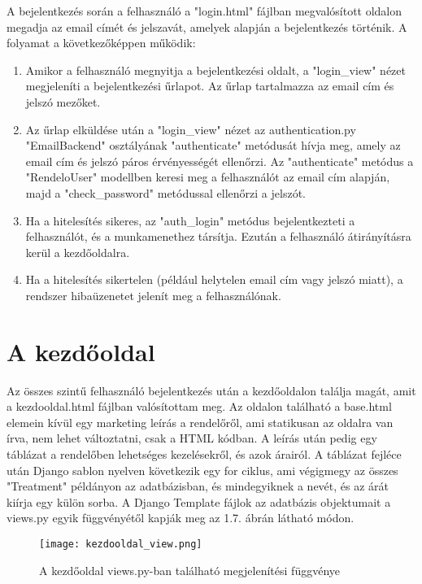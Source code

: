 A bejelentkezés során a felhasználó a "login.html" fájlban megvalósított oldalon megadja az email címét és jelszavát, amelyek alapján a bejelentkezés történik. A folyamat a következőképpen működik:

\begin{enumerate}
	\item Amikor a felhasználó megnyitja a bejelentkezési oldalt, a "login\_view" nézet megjeleníti a bejelentkezési űrlapot. Az űrlap tartalmazza az email cím és jelszó mezőket.
	\item Az űrlap elküldése után a "login\_view" nézet az authentication.py "EmailBackend" osztályának "authenticate" metódusát hívja meg, amely az email cím és jelszó páros érvényességét ellenőrzi. Az "authenticate" metódus a "RendeloUser" modellben keresi meg a felhasználót az email cím alapján, majd a "check\_password" metódussal ellenőrzi a jelszót.
	\item Ha a hitelesítés sikeres, az "auth\_login" metódus bejelentkezteti a felhasználót, és a munkamenethez társítja. Ezután a felhasználó átirányításra kerül a kezdőoldalra.
	\item Ha a hitelesítés sikertelen (például helytelen email cím vagy jelszó miatt), a rendszer hibaüzenetet jelenít meg a felhasználónak.
\end{enumerate}

\section{A kezdőoldal}

Az összes szintű felhasználó bejelentkezés után a kezdőoldalon találja magát, amit a kezdooldal.html fájlban valósítottam meg. Az oldalon található a base.html elemein kívül egy marketing leírás a rendelőről, ami statikusan az oldalra van írva, nem lehet változtatni, csak a HTML kódban.
A leírás után pedig egy táblázat a rendelőben lehetséges kezelésekről, és azok árairól. A táblázat fejléce után Django sablon nyelven következik egy for ciklus, ami végigmegy az összes "Treatment" példányon az adatbázisban, és mindegyiknek a nevét, és az árát kiírja egy külön sorba. A Django Template fájlok az adatbázis objektumait a views.py egyik függvényétől kapják meg az 1.7. ábrán látható módon.

\begin{figure}[H]
	\caption{A kezdőoldal views.py-ban található megjelenítési függvénye}
	\label{fig:kezdooldal}
	\centering
	\texttt{[image: kezdooldal\_view.png]}
\end{figure}

